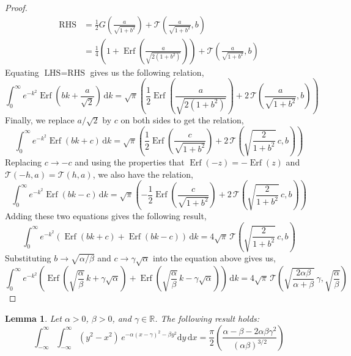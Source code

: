 \documentclass[journal]{IEEEtran}
\theoremstyle{plain}
\newtheorem{lemma}[theorem]{Lemma}
\theoremstyle{definition}
\theoremstyle{remark}
\newcommand{\R}{\mathbb{R}}
\newcommand{\Ot}{\mathcal{T}}
\newcommand{\Erf}{\operatorname{Erf}}
\newcommand{\dd}{\mathrm{d}}
\newcommand{\LHS}{\text{LHS}}
\newcommand{\RHS}{\text{RHS}}
\begin{document}
\begin{proof}
\begin{equation}
\begin{split}
    \RHS &= \frac{1}{2} G\left(\frac{a}{\sqrt{1+b^2}}\right) + \Ot\left(\frac{a}{\sqrt{1+b^2}}, b\right) \\
    &= \frac{1}{4} \left(1 + \Erf\left(\frac{a}{\sqrt{2(1+b^2)}}\right)\right) + \Ot\left(\frac{a}{\sqrt{1+b^2}}, b\right)
\end{split}
\end{equation}
Equating $\LHS = \RHS$ gives us the following relation,
\begin{equation}
    \int_0^\infty e^{-k^2} \Erf\left(bk + \frac{a}{\sqrt{2}}\right) \, \dd k = \sqrt{\pi}\left( \frac{1}{2}\Erf\left(\frac{a}{\sqrt{2(1+b^2)}}\right) + 2 \,\Ot\left(\frac{a}{\sqrt{1+b^2}}, b\right) \right)
\end{equation}
Finally, we replace $a/\sqrt{2}$ by $c$ on both sides to get the relation,
\begin{equation}
    \int_0^\infty e^{-k^2} \Erf\left(bk + c\right) \, \dd k = \sqrt{\pi}\left( \frac{1}{2}\Erf\left(\frac{c}{\sqrt{1+b^2}}\right) + 2 \,\Ot\left(\sqrt{\frac{2}{1+b^2}} \, c, b\right) \right)
\end{equation}
Replacing $c\rightarrow-c$ and using the properties that $\Erf(-z) = -\Erf(z)$ and $\Ot(-h, a) = \Ot(h, a)$,  we also have the relation,
\begin{equation}
    \int_0^\infty e^{-k^2} \Erf\left(bk - c\right) \, \dd k = \sqrt{\pi}\left( -\frac{1}{2}\Erf\left(\frac{c}{\sqrt{1+b^2}}\right) + 2 \,\Ot\left(\sqrt{\frac{2}{1+b^2}} \, c, b\right) \right)
\end{equation}
Adding these two equations gives the following result,
\begin{equation}
    \int_0^\infty e^{-k^2} \left(\Erf\left(bk + c\right) + \Erf\left(bk - c\right)\right)\, \dd k = 4 \sqrt{\pi} \,\Ot\left(\sqrt{\frac{2}{1+b^2}} \, c, b\right)
\end{equation}
Substituting $b\rightarrow \sqrt{\alpha/\beta}$ and $c\rightarrow \gamma \sqrt{\alpha}$ into the equation above gives us,
\begin{equation}
    \int_0^\infty e^{-k^2} \left(\Erf\left(\sqrt{\frac{\alpha}{\beta}} \, k + \gamma \sqrt{\alpha}\right) + \Erf\left(\sqrt{\frac{\alpha}{\beta}} \, k - \gamma \sqrt{\alpha}\right)\right)\, \dd k = 4 \sqrt{\pi} \,\Ot\left(\sqrt{\frac{2 \alpha \beta}{\alpha + \beta}} \, \gamma, \sqrt{\frac{\alpha}{\beta}}\right)
\end{equation}
\end{proof}


\begin{lemma} \label{lemma:for_crossing}
Let $\alpha > 0$, $\beta > 0$, and $\gamma \in \R$. The following result holds:
\begin{equation}
    \int_{-\infty}^\infty \int_{-\infty}^\infty \left(y^2-x^2\right) \, e^{-\alpha(x-\gamma)^2-\beta y^2} \dd y \, \dd x = \frac{\pi}{2} \left(\frac{\alpha - \beta - 2\alpha \beta \gamma^2}{\left(\alpha\beta\right)^{3/2}}\right)
\end{equation}
\end{lemma}
\end{document}
